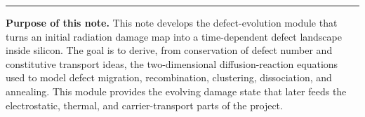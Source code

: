 \documentclass[11pt]{article}
\begin{document}

\hrule
\vspace{0.8em}

\begin{overviewbox}
\textbf{Purpose of this note.} This note develops the defect-evolution module that turns an initial radiation damage map into a time-dependent defect landscape inside silicon. The goal is to derive, from conservation of defect number and constitutive transport ideas, the two-dimensional diffusion-reaction equations used to model defect migration, recombination, clustering, dissociation, and annealing. This module provides the evolving damage state that later feeds the electrostatic, thermal, and carrier-transport parts of the project.
\end{overviewbox}

\ProjectTOC


\SymbolsAcronymsSection
\end{document}
